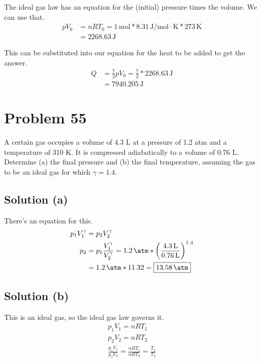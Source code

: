 \documentclass[12pt]{article}
\begin{document}
            The ideal gas law has an equation for the (initial) pressure times the volume. 
            We can use that.
            \begin{align}
                pV_0    &=  nRT_0
                    =   1\,\unit{\mole} * 8.31\,\unit{\joule/\mole\cdot\kelvin} * 273\,\unit{\kelvin}\\
                    &=  2268.63\,\unit{\joule}
            \end{align}

            This can be substituted into our equation for the heat to be added to get the answer.
            \begin{align}
                Q   &=  \frac{7}{2} pV_0
                    =   \frac{7}{2} * 2268.63\,\unit{\joule}\\
                    &=  \boxed{7940.205\,\unit{\joule}}
            \end{align}

    \pagebreak
    \section{Problem 55}
        A certain gas occupies a volume of 4.3 L at a pressure of 1.2 atm and a temperature of 310 K. 
        It is compressed adiabatically to a volume of 0.76 L. 
        Determine (a) the final pressure and (b) the final temperature, assuming the gas to be an ideal gas for which $\gamma = 1.4$.

        \subsection{Solution (a)}
            There's an equation for this.
            \begin{align}
                p_1 V_1^{\gamma}    &=  p_2 V_2^{\gamma}\\
                p_2 &=  p_1 \frac{V_1^{\gamma}}{V_2^{\gamma}}
                    =   1.2\,\unit{\atm} * \left( \frac{4.3\,\unit{\liter}}{0.76\,\unit{\liter}} \right)^{1.4}\\
                    &=  1.2\,\unit{\atm} * 11.32
                    =   \boxed{13.58\,\unit{\atm}}
            \end{align}

        \subsection{Solution (b)}
            This is an ideal gas, so the ideal gas law governs it.
            \begin{gather}
                p_1 V_1 =   nR T_1\\
                p_2 V_2 =   nR T_2\\
                \frac{p_1 V_1}{p_2 V_2} =   \frac{nR T_1}{nR T_2}   =   \frac{T_1}{T_2}
            \end{gather}
\end{document}
